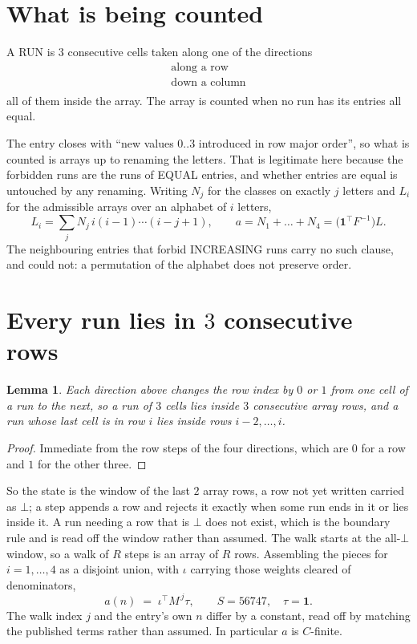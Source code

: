 \documentclass[11pt,a4paper]{article}
\theoremstyle{plain}
\newtheorem{lemma}[theorem]{Lemma}
\theoremstyle{definition}
\begin{document}
\section{What is being counted}

A RUN is $3$ consecutive cells taken along one of the directions
\[
\begin{array}{l}
\text{along a row} \\
\text{down a column} \\
\end{array}
\]
all of them inside the array. The array is counted when no run has its entries all equal.


The entry closes with ``new values $0..3$ introduced in row major order'', so what is counted
is arrays up to renaming the letters. That is legitimate here because the forbidden runs are
the runs of EQUAL entries, and whether entries are equal is untouched by any renaming. Writing
$N_j$ for the classes on exactly $j$ letters and $L_i$ for the admissible arrays over an
alphabet of $i$ letters,
\[
L_i=\sum_j N_j\,i(i-1)\cdots(i-j+1),\qquad
a=N_1+\dots+N_{4}=\bigl(\mathbf{1}^{\!\top}F^{-1}\bigr)L .
\]
The neighbouring entries that forbid INCREASING runs carry no such clause, and could not: a
permutation of the alphabet does not preserve order.

\section{Every run lies in $3$ consecutive rows}

\begin{lemma}\label{lem:win}
Each direction above changes the row index by $0$ or $1$ from one cell of a run to the next, so
a run of $3$ cells lies inside $3$ consecutive array rows, and a run whose last cell is in
row $i$ lies inside rows $i-2,\dots,i$.
\end{lemma}

\begin{proof}
Immediate from the row steps of the four directions, which are $0$ for a row and $1$ for the
other three.
\end{proof}

So the state is the window of the last $2$ array rows, a row not yet written carried as
$\bot$; a step appends a row and rejects it exactly when some run ends in it or lies inside it.
A run needing a row that is $\bot$ does not exist, which is the boundary rule and is read off
the window rather than assumed. The walk starts at the all-$\bot$ window, so a walk of $R$ steps
is an array of $R$ rows. Assembling the pieces for $i=1,\dots,4$ as a disjoint union, with $\iota$ carrying those weights cleared of denominators,
\[
a(n)\;=\;\iota^{\!\top}M^{\,j}\tau ,\qquad S=56747,\quad\tau=\mathbf{1} .
\]
The walk index $j$ and the entry's own $n$ differ by a constant, read off by matching the
published terms rather than assumed. In particular $a$ is $C$-finite.
\end{document}
